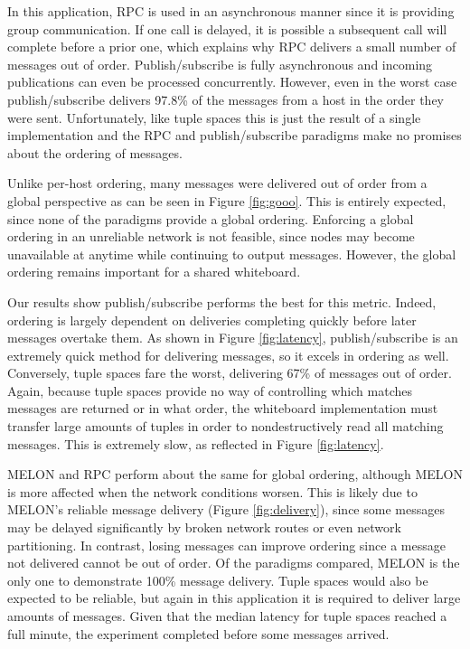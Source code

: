 \documentclass{llncs}
\begin{document}
In this application, RPC is used in an asynchronous manner since it is providing group communication. If one call is delayed, it is possible a subsequent call will complete before a prior one, which explains why RPC delivers a small number of messages out of order. Publish/subscribe is fully asynchronous and incoming publications can even be processed concurrently. However, even in the worst case publish/subscribe delivers 97.8\% of the messages from a host in the order they were sent. Unfortunately, like tuple spaces this is just the result of a single implementation and the RPC and publish/subscribe paradigms make no promises about the ordering of messages. 

Unlike per-host ordering, many messages were delivered out of order from a global perspective as can be seen in Figure \ref{fig:gooo}. This is entirely expected, since none of the paradigms provide a global ordering. Enforcing a global ordering in an unreliable network is not feasible, since nodes may become unavailable at anytime while continuing to output messages. However, the global ordering remains important for a shared whiteboard.

Our results show publish/subscribe performs the best for this metric. Indeed, ordering is largely dependent on deliveries completing quickly before later messages overtake them. As shown in Figure \ref{fig:latency}, publish/subscribe is an extremely quick method for delivering messages, so it excels in ordering as well. Conversely, tuple spaces fare the worst, delivering 67\% of messages out of order. Again, because tuple spaces provide no way of controlling which matches messages are returned or in what order, the whiteboard implementation must transfer large amounts of tuples in order to nondestructively read all matching messages. This is extremely slow, as reflected in Figure \ref{fig:latency}.

MELON and RPC perform about the same for global ordering, although MELON is more affected when the network conditions worsen. This is likely due to MELON's reliable message delivery (Figure \ref{fig:delivery}), since some messages may be delayed significantly by broken network routes or even network partitioning. In contrast, losing messages can improve ordering since a message not delivered cannot be out of order. Of the paradigms compared, MELON is the only one to demonstrate 100\% message delivery. Tuple spaces would also be expected to be reliable, but again in this application it is required to deliver large amounts of messages. Given that the median latency for tuple spaces reached a full minute, the experiment completed before some messages arrived.
\end{document}
